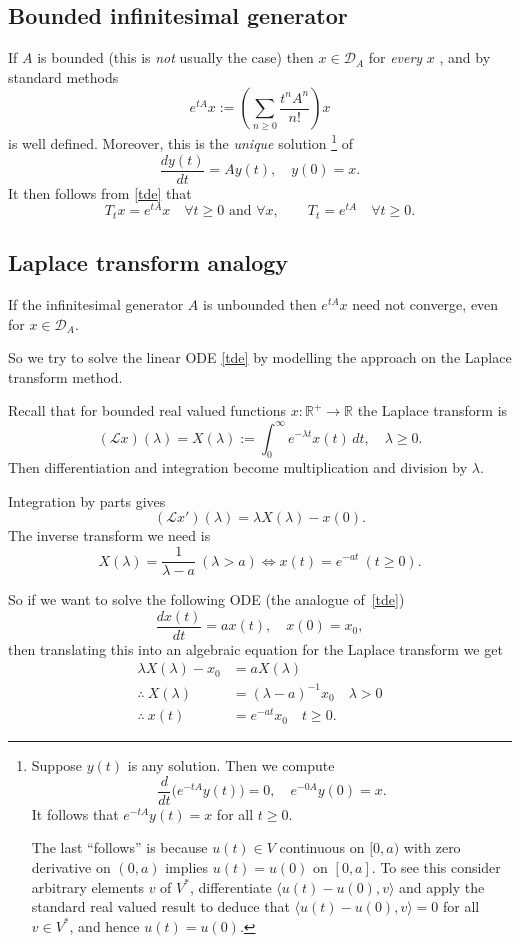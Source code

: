 \documentclass[a4paper]{amsart}
\theoremstyle{plain}
\theoremstyle{definition}
\theoremstyle{remark}
\begin{document}
\subsection{Bounded infinitesimal generator}
 If $ A $ is bounded (this is \emph{not} usually the case) then $ x \in \mathcal{D}_A $    for \emph{every} $ x $ , and by standard methods
\[  e^{tA }x :=\left( \sum_{n\geq 0} \frac{t^n A^n }{n!}\right) x  \]
is well defined.  Moreover, this is the \emph{unique} solution%
\footnote{Suppose $ y(t) $ is any solution.  Then  we compute
\[ \frac{d}{dt} \big(e^{-tA}y(t)\big) = 0, \quad    e^{-0A}y(0) = x.\]
It follows that $ e^{-tA}y(t)= x $ for all $ t\geq 0 $.  

The last ``follows'' is because $   u(t) \in V$ continuous on $ [0,a) $ with zero derivative on $ (0,a) $ implies $ u(t) = u(0) $ on $ [0,a] $.  To see this consider  arbitrary elements $ v$  of $ V^* $, differentiate  $ \langle u(t)-u(0), v \rangle $ and apply the standard real valued result    to deduce that  $  \langle u(t)- u(0), v \rangle = 0 $ for all $ v \in V^* $, and hence $ u(t) = u(0) $.}
of 
\[    \frac{dy(t)}{dt}    = A y(t), \quad y(0) =x.\]
It then follows from  \eqref{tde} that
\[  T_t x = e^{tA} x \quad  \forall t\geq 0 \text{ and } \forall x, \qquad T_t = e^{tA} \quad  \forall t \geq 0 .\]


\subsection{Laplace transform analogy}

If the infinitesimal generator $ A $ is unbounded then $ e^{tA} x $ need not converge, even for $ x \in \mathcal{D}_A $.

So we try to solve the linear ODE \eqref{tde} by modelling the approach on the Laplace transform method.

\bigskip
Recall that for bounded real valued functions $ x:\mathbb{R}^+ \to \mathbb{R}  $ the Laplace transform is
\[
(\mathcal{L}x)(\lambda)= X(\lambda) := \int_0^\infty e^{-\lambda t} x(t)\, dt, \quad \lambda \geq 0. \]
Then differentiation and integration become multiplication and division by $ \lambda $.

Integration by parts gives
\[
(\mathcal{L} x')(\lambda) = \lambda X(\lambda) - x(0).
\]
The inverse transform we need is 
\[
X(\lambda ) = \frac{1}{\lambda - a } \ (\lambda > a) \Longleftrightarrow  x(t) = e^{-at}\ (t \geq 0 ).
\] 

\bigskip So if we want to solve the following ODE (the analogue of~\eqref{tde}) 
\[
\frac{dx  (t)}{dt} = ax(t), \quad x(0) = x_0,
\]
then translating this into an algebraic equation for the Laplace transform we get
\begin{align*}
\lambda X(\lambda) - x_0 &= a X(\lambda) \\
\therefore\ X(\lambda) &= (\lambda-a)^{-1} x_0 \quad \lambda >0 \\
\therefore\  x(t) &= e^{-at} x_0 \quad t\geq 0.
\end{align*} 
\end{document}
